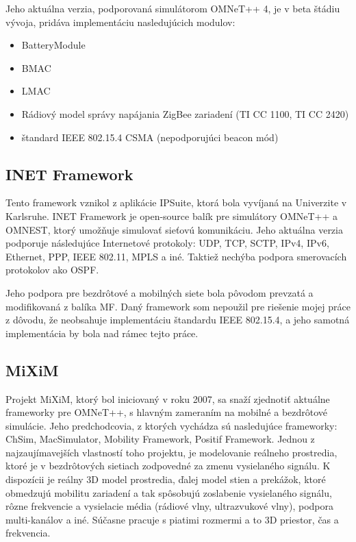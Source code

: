 \documentclass[11pt,twoside,a4paper]{book}
\begin{document}
Jeho aktuálna verzia, podporovaná simulátorom OMNeT++ 4, je v beta štádiu vývoja, pridáva implementáciu nasledujúcich modulov:
\begin{itemize}
 \item BatteryModule
 \item BMAC
 \item LMAC
 \item Rádiový model správy napájania ZigBee zariadení (TI CC 1100, TI CC 2420)
 \item štandard IEEE 802.15.4 CSMA (nepodporujúci beacon mód)
\end{itemize}


\subsection{INET Framework}
Tento framework vznikol z aplikácie IPSuite, ktorá bola vyvíjaná na Univerzite v Karlsruhe. INET Framework je open-source balík pre simulátory OMNeT++ a OMNEST, ktorý umožňuje simulovať sieťovú komunikáciu. Jeho aktuálna verzia podporuje následujúce Internetové protokoly: UDP, TCP, SCTP, IPv4, IPv6, Ethernet, PPP, IEEE 802.11, MPLS a iné. Taktiež nechýba podpora smerovacích protokolov ako OSPF.

Jeho podpora pre bezdrôtové a mobilných siete bola pôvodom prevzatá a modifikovaná z balíka MF. Daný framework som nepoužil pre riešenie mojej práce z dôvodu, že neobsahuje implementáciu štandardu IEEE 802.15.4, a jeho samotná implementácia by bola nad rámec tejto práce.


\subsection{MiXiM}
Projekt MiXiM, ktorý bol iniciovaný v roku 2007, sa snaží zjednotiť aktuálne frameworky pre OMNeT++, s hlavným zameraním na mobilné a bezdrôtové simulácie. Jeho predchodcovia, z ktorých vychádza sú nasledujúce frameworky: ChSim, MacSimulator, Mobility Framework, Positif Framework. Jednou z najzaujímavejších vlastností toho projektu, je modelovanie reálneho prostredia, ktoré je v bezdrôtových sietiach zodpovedné za zmenu vysielaného signálu. K dispozícii je reálny 3D model prostredia, ďalej model stien a prekážok, ktoré obmedzujú mobilitu zariadení a tak spôsobujú zoslabenie vysielaného signálu, rôzne frekvencie a vysielacie média (rádiové vlny, ultrazvukové vlny), podpora multi-kanálov a iné. Súčasne pracuje s piatimi rozmermi a to 3D priestor, čas a frekvencia.
\end{document}
